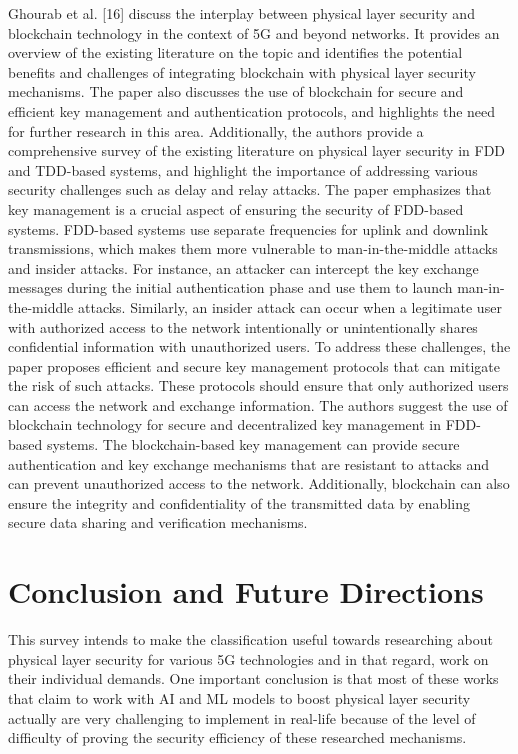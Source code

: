 \documentclass[conference]{IEEEtran}
\begin{document}
Ghourab et al. [16] discuss the interplay between physical layer security and blockchain technology in the context of 5G and beyond networks. It provides an overview of the existing literature on the topic and identifies the potential benefits and challenges of integrating blockchain with physical layer security mechanisms. The paper also discusses the use of blockchain for secure and efficient key management and authentication protocols, and highlights the need for further research in this area. Additionally, the authors provide a comprehensive survey of the existing literature on physical layer security in FDD and TDD-based systems, and highlight the importance of addressing various security challenges such as delay and relay attacks.
The paper emphasizes that key management is a crucial aspect of ensuring the security of FDD-based systems. FDD-based systems use separate frequencies for uplink and downlink transmissions, which makes them more vulnerable to man-in-the-middle attacks and insider attacks. For instance, an attacker can intercept the key exchange messages during the initial authentication phase and use them to launch man-in-the-middle attacks. Similarly, an insider attack can occur when a legitimate user with authorized access to the network intentionally or unintentionally shares confidential information with unauthorized users.
To address these challenges, the paper proposes efficient and secure key management protocols that can mitigate the risk of such attacks. These protocols should ensure that only authorized users can access the network and exchange information. The authors suggest the use of blockchain technology for secure and decentralized key management in FDD-based systems. The blockchain-based key management can provide secure authentication and key exchange mechanisms that are resistant to attacks and can prevent unauthorized access to the network. Additionally, blockchain can also ensure the integrity and confidentiality of the transmitted data by enabling secure data sharing and verification mechanisms.


\section{Conclusion and Future Directions}

This survey intends to make the classification useful towards researching about physical layer security for various 5G technologies and in that regard, work on their individual demands. One important conclusion is that most of these works that claim to work with AI and ML models to boost physical layer security actually are very challenging to implement in real-life because of the level of difficulty of proving the security efficiency of these researched mechanisms. 
\end{document}

